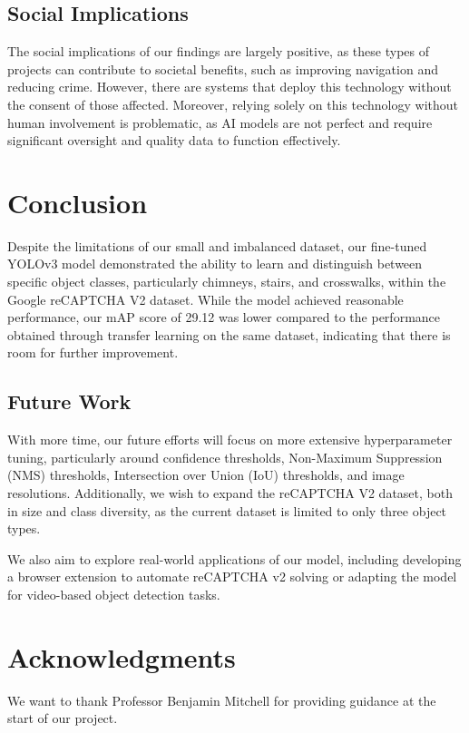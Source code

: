 \documentclass{article}
\begin{document}
\subsection{Social Implications}
The social implications of our findings are largely positive, as these types of projects can contribute to societal benefits, such as improving navigation and reducing crime. However, there are systems that deploy this technology without the consent of those affected. Moreover, relying solely on this technology without human involvement is problematic, as AI models are not perfect and require significant oversight and quality data to function effectively.

\section{Conclusion}
\label{conclusion}

Despite the limitations of our small and imbalanced dataset, our fine-tuned YOLOv3 model demonstrated the ability to learn and distinguish between specific object classes, particularly chimneys, stairs, and crosswalks, within the Google reCAPTCHA V2 dataset. While the model achieved reasonable performance, our mAP score of 29.12 was lower compared to the performance obtained through transfer learning on the same dataset, indicating that there is room for further improvement.

\subsection{Future Work}

With more time, our future efforts will focus on more extensive hyperparameter tuning, particularly around confidence thresholds, Non-Maximum Suppression (NMS) thresholds, Intersection over Union (IoU) thresholds, and image resolutions. Additionally, we wish to expand the reCAPTCHA V2 dataset, both in size and class diversity, as the current dataset is limited to only three object types.

We also aim to explore real-world applications of our model, including developing a browser extension to automate reCAPTCHA v2 solving or adapting the model for video-based object detection tasks.

\section*{Acknowledgments}
We want to thank Professor Benjamin Mitchell for providing guidance at the start of our project.
\end{document}
